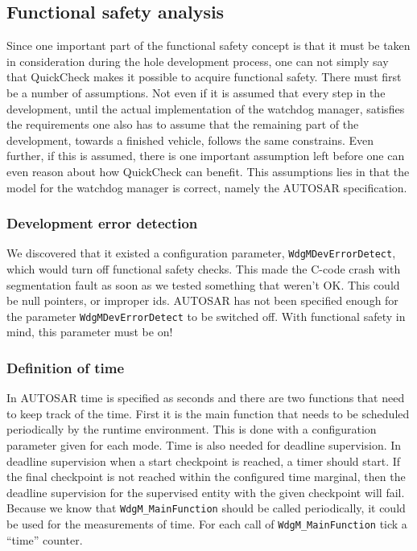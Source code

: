 \subsection{Functional safety analysis}
Since one important part of the functional safety concept is that it must be
taken in consideration during the hole development process, one can not simply
say that QuickCheck makes it possible to acquire functional safety. There must
first be a number of assumptions. Not even if it is assumed that
every step in the development, until the actual implementation of the watchdog
manager, satisfies the requirements one also has to assume that the remaining
part of the development, towards a finished vehicle, follows the same
constrains. Even further, if this is assumed, there is one important
assumption left before
one can even reason about how QuickCheck can benefit.
This assumptions lies in that the model for the watchdog
manager is correct, namely the AUTOSAR specification.

\subsubsection{Development error detection}
\label{SEC:DEVERRORDETECT}
We discovered that it existed a configuration parameter,
\lstinline!WdgMDevErrorDetect!, which would turn off functional safety
checks. This made the C-code crash with segmentation fault as soon as we tested
something that weren't OK. This could be null pointers, or improper ids. AUTOSAR
has not been specified enough for the parameter \lstinline!WdgMDevErrorDetect!
to be switched off. With functional safety in mind, this parameter must be on!

\subsubsection{Definition of time}
\label{SEC:FUNCTIONAL_SAFETY_TIME}
In AUTOSAR time is specified as seconds and there are two functions that need to
keep track of the time. First it is the main function that needs to be scheduled
periodically by the runtime environment. This is done with a configuration
parameter given for each mode. Time is also needed for deadline supervision. In
deadline supervision when a start checkpoint is reached, a timer should
start. If the final checkpoint is not reached within the configured time
marginal, then the deadline supervision for the supervised entity with the given
checkpoint will fail. Because we know that \lstinline!WdgM_MainFunction! should
be called periodically, it could be used for the measurements of time. For each
call of \lstinline!WdgM_MainFunction! tick a ``time'' counter.


